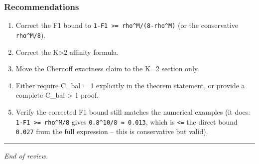 \documentclass[
  12pt,
]{article}
\providecommand{\tightlist}{%
  \setlength{\itemsep}{0pt}\setlength{\parskip}{0pt}}
\begin{document}
\subsubsection{Recommendations}\label{recommendations}

\begin{enumerate}
\def\labelenumi{\arabic{enumi}.}
\tightlist
\item
  Correct the F1 bound to
  \texttt{1-F1\ \textgreater{}=\ rho\^{}M/(8-rho\^{}M)} (or the
  conservative \texttt{rho\^{}M/8}).
\item
  Correct the K\textgreater2 affinity formula.
\item
  Move the Chernoff exactness claim to the K=2 section only.
\item
  Either require C\_bal = 1 explicitly in the theorem statement, or
  provide a complete C\_bal \textgreater{} 1 proof.
\item
  Verify the corrected F1 bound still matches the numerical examples (it
  does: \texttt{1-F1\ \textgreater{}=\ rho\^{}M/8} gives
  \texttt{0.8\^{}10/8\ ≈\ 0.013}, which is \texttt{\textless{}=} the
  direct bound \texttt{0.027} from the full expression -- this is
  conservative but valid).
\end{enumerate}

\begin{center}\rule{0.5\linewidth}{0.5pt}\end{center}

\emph{End of review.}
\end{document}
